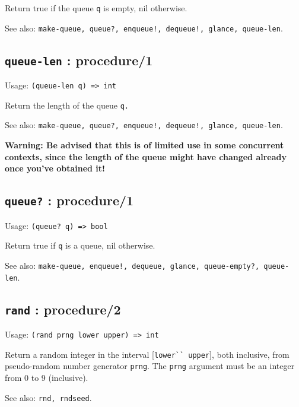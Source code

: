 \documentclass[
]{article}
\newcommand{\passthrough}[1]{#1}
\begin{document}
Return true if the queue \passthrough{\lstinline!q!} is empty, nil
otherwise.

See also:
\passthrough{\lstinline"make-queue, queue?, enqueue!, dequeue!, glance, queue-len"}.

\hypertarget{queue-len-procedure1-1}{%
\subsection{\texorpdfstring{\texttt{queue-len} :
procedure/1}{queue-len : procedure/1}}\label{queue-len-procedure1-1}}

Usage: \passthrough{\lstinline!(queue-len q) => int!}

Return the length of the queue \passthrough{\lstinline!q.!}

See also:
\passthrough{\lstinline"make-queue, queue?, enqueue!, dequeue!, glance, queue-len"}.

\textbf{Warning: Be advised that this is of limited use in some
concurrent contexts, since the length of the queue might have changed
already once you've obtained it!}

\hypertarget{queue-procedure1-1}{%
\subsection{\texorpdfstring{\texttt{queue?} :
procedure/1}{queue? : procedure/1}}\label{queue-procedure1-1}}

Usage: \passthrough{\lstinline!(queue? q) => bool!}

Return true if \passthrough{\lstinline!q!} is a queue, nil otherwise.

See also:
\passthrough{\lstinline"make-queue, enqueue!, dequeue, glance, queue-empty?, queue-len"}.

\hypertarget{rand-procedure2-1}{%
\subsection{\texorpdfstring{\texttt{rand} :
procedure/2}{rand : procedure/2}}\label{rand-procedure2-1}}

Usage: \passthrough{\lstinline!(rand prng lower upper) => int!}

Return a random integer in the interval
{[}\passthrough{\lstinline!lower`` upper!}{]}, both inclusive, from
pseudo-random number generator \passthrough{\lstinline!prng!}. The
\passthrough{\lstinline!prng!} argument must be an integer from 0 to 9
(inclusive).

See also: \passthrough{\lstinline!rnd, rndseed!}.
\end{document}
